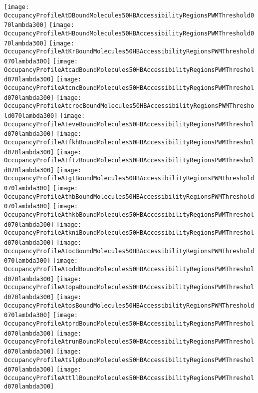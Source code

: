 \documentclass[11pt]{article}
\begin{document}
 


\begin{center}
\texttt{[image: OccupancyProfileAtDBoundMolecules50HBAccessibilityRegionsPWMThreshold070lambda300]}
\texttt{[image: OccupancyProfileAtHBoundMolecules50HBAccessibilityRegionsPWMThreshold070lambda300]}
\texttt{[image: OccupancyProfileAtKrBoundMolecules50HBAccessibilityRegionsPWMThreshold070lambda300]}
\texttt{[image: OccupancyProfileAtcadBoundMolecules50HBAccessibilityRegionsPWMThreshold070lambda300]}
\texttt{[image: OccupancyProfileAtcncBoundMolecules50HBAccessibilityRegionsPWMThreshold070lambda300]}
\texttt{[image: OccupancyProfileAtcrocBoundMolecules50HBAccessibilityRegionsPWMThreshold070lambda300]}
\texttt{[image: OccupancyProfileAteveBoundMolecules50HBAccessibilityRegionsPWMThreshold070lambda300]}
\texttt{[image: OccupancyProfileAtfkhBoundMolecules50HBAccessibilityRegionsPWMThreshold070lambda300]}
\texttt{[image: OccupancyProfileAtftzBoundMolecules50HBAccessibilityRegionsPWMThreshold070lambda300]}
\texttt{[image: OccupancyProfileAtgtBoundMolecules50HBAccessibilityRegionsPWMThreshold070lambda300]}
\texttt{[image: OccupancyProfileAthbBoundMolecules50HBAccessibilityRegionsPWMThreshold070lambda300]}
\texttt{[image: OccupancyProfileAthkbBoundMolecules50HBAccessibilityRegionsPWMThreshold070lambda300]}
\texttt{[image: OccupancyProfileAtkniBoundMolecules50HBAccessibilityRegionsPWMThreshold070lambda300]}
\texttt{[image: OccupancyProfileAtocBoundMolecules50HBAccessibilityRegionsPWMThreshold070lambda300]}
\texttt{[image: OccupancyProfileAtoddBoundMolecules50HBAccessibilityRegionsPWMThreshold070lambda300]}
\texttt{[image: OccupancyProfileAtopaBoundMolecules50HBAccessibilityRegionsPWMThreshold070lambda300]}
\texttt{[image: OccupancyProfileAtosBoundMolecules50HBAccessibilityRegionsPWMThreshold070lambda300]}
\texttt{[image: OccupancyProfileAtprdBoundMolecules50HBAccessibilityRegionsPWMThreshold070lambda300]}
\texttt{[image: OccupancyProfileAtrunBoundMolecules50HBAccessibilityRegionsPWMThreshold070lambda300]}
\texttt{[image: OccupancyProfileAtslpBoundMolecules50HBAccessibilityRegionsPWMThreshold070lambda300]}
\texttt{[image: OccupancyProfileAttllBoundMolecules50HBAccessibilityRegionsPWMThreshold070lambda300]}
\end{center}


\end{document}
